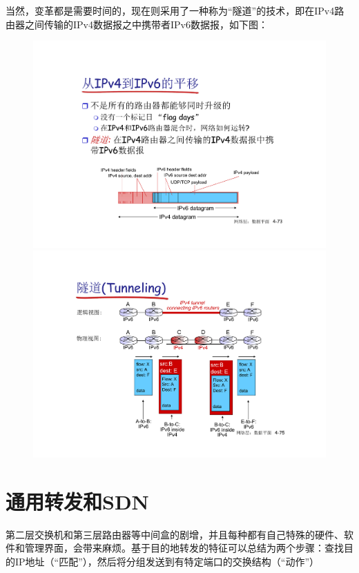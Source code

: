 \documentclass[]{report}
\begin{document}
		当然，变革都是需要时间的，现在则采用了一种称为“隧道”的技术，即在IPv4路由器之间传输的IPv4数据报之中携带者IPv6数据报，如下图：
		\begin{figure}[h]
			\centering
			\begin{minipage}{20em}
				\centering
				\includegraphics[scale = 0.3]{images/IPv6_tunnel.pdf}
			\end{minipage}
			\begin{minipage}{20em}
				\centering
				\includegraphics[scale = 0.3]{images/IPv6_tunnel_use.pdf}
			\end{minipage}
		\end{figure}
	\section{通用转发和SDN}
	第二层交换机和第三层路由器等中间盒的剧增，并且每种都有自己特殊的硬件、软件和管理界面，会带来麻烦。基于目的地转发的特征可以总结为两个步骤：查找目的IP地址（“匹配”），然后将分组发送到有特定端口的交换结构（“动作”）
\end{document}
